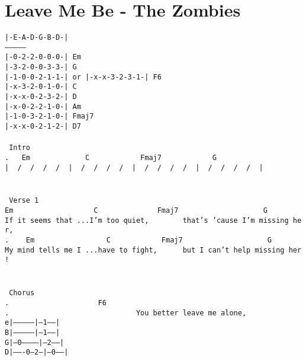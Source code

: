 \newpage
\section{Leave Me Be - The Zombies}
\label{Leave Me Be - The Zombies}
\texttt{|-E-A-D-G-B-D-|\\
---------------\\
|-0-2-2-0-0-0-|\ Em\\
|-3-2-0-0-3-3-|\ G\\
|-1-0-0-2-1-1-|\ or\ |-x-x-3-2-3-1-|\ F6\\
|-x-3-2-0-1-0-|\ C\\
|-x-x-0-2-3-2-|\ D\\
|-x-0-2-2-1-0-|\ Am\\
|-1-0-3-2-1-0-|\ Fmaj7\\
|-x-x-0-2-1-2-|\ D7\\
\\
\lbrack\ Intro\rbrack\\
.\ \ \ Em\ \ \ \ \ \ \ \ \ \ \ \ \ C\ \ \ \ \ \ \ \ \ \ \ \ Fmaj7\ \ \ \ \ \ \ \ \ \ \ \ G\\
|\ \ /\ \ /\ \ /\ \ /\ \ |\ \ /\ \ /\ \ /\ \ /\ \ |\ \ /\ \ /\ \ /\ \ /\ \ |\ \ /\ \ /\ \ /\ \ /\ \ |\\
\\
\\
\lbrack\ Verse\ 1\rbrack\\
Em\ \ \ \ \ \ \ \ \ \ \ \ \ \ \ \ \ \ \ C\ \ \ \ \ \ \ \ \ \ \ \ \ \ Fmaj7\ \ \ \ \ \ \ \ \ \ \ \ \ \ \ \ \ \ \ \ G\\
If\ it\ seems\ that\ ...I'm\ too\ quiet,\ \ \ \ \ \ \ \ that's\ 'cause\ I'm\ missing\ her,\\
.\ \ \ \ Em\ \ \ \ \ \ \ \ \ \ \ \ \ \ \ \ \ C\ \ \ \ \ \ \ \ \ \ \ \ Fmaj7\ \ \ \ \ \ \ \ \ \ \ \ \ \ \ \ \ \ \ \ G\\
My\ mind\ tells\ me\ I\ ...have\ to\ fight,\ \ \ \ \ \ but\ I\ can't\ help\ missing\ her!\\
\\
\\
\lbrack\ Chorus\rbrack\\
.\ \ \ \ \ \ \ \ \ \ \ \ \ \ \ \ \ \ \ \ \ F6\\
.\ \ \ \ \ \ \ \ \ \ \ \ \ \ \ \ \ \ \ \ \ \ \ \ \ \ \ \ \ \ You\ better\ leave\ me\ alone,\\
e|---------------|---1------|\\
B|---------------|---1------|\\
G|---0-----------|---2------|\\
D|-------0---2---|---0------|\\
}

